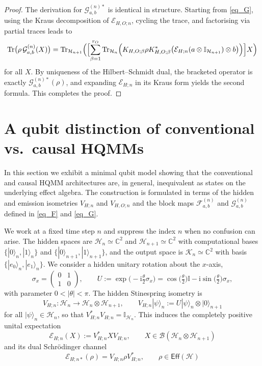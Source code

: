 \documentclass[11pt, reco]{article}
\begin{document}
\begin{proof}
The derivation for $\mathcal{G}_{a,b}^{(n)*}$ is identical in structure. Starting from \eqref{eq_G}, using the Kraus decomposition of $\mathcal{E}_{H,O;n}$, cycling the trace, and factorising via partial traces leads to
\[
\operatorname{Tr}\bigl(\rho\,\mathcal{G}_{a,b}^{(n)}(X)\bigr)
=
\operatorname{Tr}_{\mathcal{H}_{n+1}}\Bigl(
\Bigl[
\sum_{\beta=1}^{r_O}
\operatorname{Tr}_{\mathcal{H}_n}\Bigl(
K_{H,O;\beta}\rho K_{H,O;\beta}^{*}
\bigl(\mathcal{E}_{H;n}(a\otimes\mathbb{I}_{\mathcal{H}_{n+1}})\otimes b\bigr)
\Bigr)
\Bigr]X
\Bigr)
\]
for all $X$. By uniqueness of the Hilbert–Schmidt dual, the bracketed operator is exactly $\mathcal{G}_{a,b}^{(n)*}(\rho)$, and expanding $\mathcal{E}_{H;n}$ in its Kraus form yields the second formula. This completes the proof.
\end{proof}

\section{A qubit  distinction of  conventional vs.\ causal HQMMs}\label{Sec-Qubit}

In this section we exhibit a minimal qubit model \cite{YILSDH15} showing that the conventional and causal HQMM architectures are, in general, inequivalent as states on the underlying effect algebra. The construction is formulated in terms of the hidden and emission isometries $V_{H;n}$ and $V_{H,O;n}$ and the block maps $\mathcal{F}^{(n)}_{a,b}$ and $\mathcal{G}^{(n)}_{a,b}$ defined in \eqref{eq_F} and \eqref{eq_G}.

\medskip

We work at a fixed time step $n$ and suppress the index $n$ when no confusion can arise. The hidden spaces are $\mathcal{H}_n\simeq\mathbb{C}^2$ and $\mathcal{H}_{n+1}\simeq\mathbb{C}^2$ with computational bases $\{|0\rangle_n,|1\rangle_n\}$ and $\{|0\rangle_{n+1},|1\rangle_{n+1}\}$, and the output space is $\mathcal{K}_n\simeq\mathbb{C}^2$ with basis $\{|e_0\rangle_n,|e_1\rangle_n\}$. We consider a hidden unitary rotation about the $x$-axis,
\[
\sigma_x
=
\begin{pmatrix}
0 & 1\\[0.2em]
1 & 0
\end{pmatrix},
\qquad
U
:=
\exp\!\bigl(-\mathrm{i}\tfrac{\theta}{2}\sigma_x\bigr)
=
\cos\!\bigl(\tfrac{\theta}{2}\bigr)\mathbb{I}
-
\mathrm{i}\sin\!\bigl(\tfrac{\theta}{2}\bigr)\sigma_x,
\]
with parameter $0<|\theta|<\pi$. The hidden Stinespring isometry is
\begin{equation}\label{VH_Qbit}
V_{H;n}:\mathcal{H}_n\longrightarrow\mathcal{H}_n\otimes\mathcal{H}_{n+1},
\qquad
V_{H;n}|\psi\rangle_n
:=
U|\psi\rangle_n\otimes|0\rangle_{n+1}
\end{equation}
for all $|\psi\rangle_n\in\mathcal{H}_n$, so that $V_{H;n}^{*}V_{H;n}=\mathbb{I}_{\mathcal{H}_n}$. This induces the completely positive unital expectation
\[
\mathcal{E}_{H;n}(X)
:=
V_{H;n}^{*}X V_{H;n},
\qquad X\in\mathcal{B}(\mathcal{H}_n\otimes\mathcal{H}_{n+1})
\]
and its dual Schrödinger channel
\[
\mathcal{E}_{H;n*}(\rho)
=
V_{H;n}\rho V_{H;n}^{*},
\qquad \rho\in\mathsf{Eff}(\mathcal{H})
\]
\end{document}

